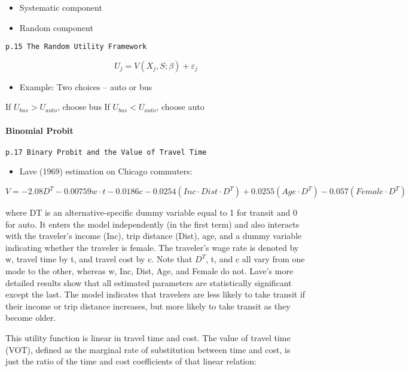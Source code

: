\documentclass[]{article}
\providecommand{\tightlist}{%
  \setlength{\itemsep}{0pt}\setlength{\parskip}{0pt}}
\let\oldparagraph\paragraph
\renewcommand{\paragraph}[1]{\oldparagraph{#1}\mbox{}}
\begin{document}
\begin{itemize}
\tightlist
\item
  Systematic component
\item
  Random component
\end{itemize}

\texttt{p.15\ The\ Random\ Utility\ Framework}

\[U_j = V(X_j, S;\beta) + \varepsilon_j \]

\begin{itemize}
\tightlist
\item
  Example: Two choices -- auto or bus
\end{itemize}

If \(U_{bus} > U_{auto}\), choose bus If \(U_{bus} < U_{auto}\), choose
auto

\hypertarget{binomial-probit}{%
\paragraph{Binomial Probit}\label{binomial-probit}}

\texttt{p.17\ Binary\ Probit\ and\ the\ Value\ of\ Travel\ Time}

\begin{itemize}
\tightlist
\item
  Lave (1969) estimation on Chicago commuters:
\end{itemize}

\[V=-2.08D^T-0.00759w\cdot t-0.0186c-0.0254(Inc\cdot Dist\cdot D^T)+ 0.0255(Age\cdot D^T)-0.057(Female\cdot D^T)\]

where DT is an alternative-specific dummy variable equal to 1 for
transit and 0 for auto. It enters the model independently (in the first
term) and also interacts with the traveler's income (Inc), trip distance
(Dist), age, and a dummy variable indicating whether the traveler is
female. The traveler's wage rate is denoted by w, travel time by t, and
travel cost by c. Note that \(D^T\), t, and c all vary from one mode to
the other, whereas w, Inc, Dist, Age, and Female do not. Lave's more
detailed results show that all estimated parameters are statistically
significant except the last. The model indicates that travelers are less
likely to take transit if their income or trip distance increases, but
more likely to take transit as they become older.

This utility function is linear in travel time and cost. The value of
travel time (VOT), defined as the marginal rate of substitution between
time and cost, is just the ratio of the time and cost coefficients of
that linear relation:
\end{document}
